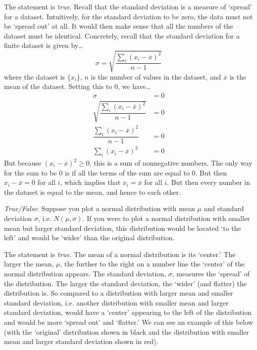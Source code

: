 \documentclass[11pt,letterpaper]{article}
\begin{document}
\sol The statement is \textit{true}. Recall that the standard deviation is a measure of `spread' for a dataset. Intuitively, for the standard deviation to be zero, the data must not be `spread out' at all. It would then make sense that all the numbers of the dataset must be identical. Concretely, recall that the standard deviation for a finite dataset is given by\dots
	\[
	\sigma= \sqrt{\dfrac{\sum_i (x_i - \overline{x})^2}{n - 1}}
	\]
where the dataset is $\{ x_i \}$, $n$ is the number of values in the dataset, and $\overline{x}$ is the mean of the dataset. Setting this to $0$, we have\dots
	\[
	\begin{aligned}
	\sigma&= 0 \\[0.3cm]
	\sqrt{\dfrac{\sum_i (x_i - \overline{x})^2}{n - 1}}&= 0 \\[0.3cm]
	\dfrac{\sum_i (x_i - \overline{x})^2}{n - 1}&= 0  \\[0.3cm]
	\sum_i (x_i - \overline{x})^2&= 0 
	\end{aligned}
	\]
But because $(x_i - \overline{x})^2 \geq 0$, this is a sum of nonnegative numbers. The only way for the sum to be 0 is if all the terms of the sum are equal to 0. But then $x_i - \overline{x}= 0$ for all $i$, which implies that $x_i= \overline{x}$ for all $i$. But then every number in the dataset is equal to the mean, and hence to each other. \pvspace{1.1cm}



\quizsol \textit{True/False}: Suppose you plot a normal distribution with mean $\mu$ and standard deviation $\sigma$, i.e. $N(\mu, \sigma)$. If you were to plot a normal distribution with smaller mean but larger standard deviation, this distribution would be located ‘to the left’ and would be ‘wider’ than the original distribution. \pspace

\sol The statement is \textit{true}. The mean of a normal distribution is its `center.' The larger the mean, $\mu$, the further to the right on a number line the `center' of the normal distribution appears. The standard deviation, $\sigma$, measures the `spread' of the distribution. The larger the standard deviation, the `wider' (and flatter) the distribution is. So compared to a distribution with larger mean and smaller standard deviation, i.e. another distribution with smaller mean and larger standard deviation, would have a `center' appearing to the left of the distribution and would be more `spread out' and `flatter.' We can see an example of this below (with the `original' distribution shown in black and the distribution with smaller mean and larger standard deviation shown in red).
 
\end{document}
